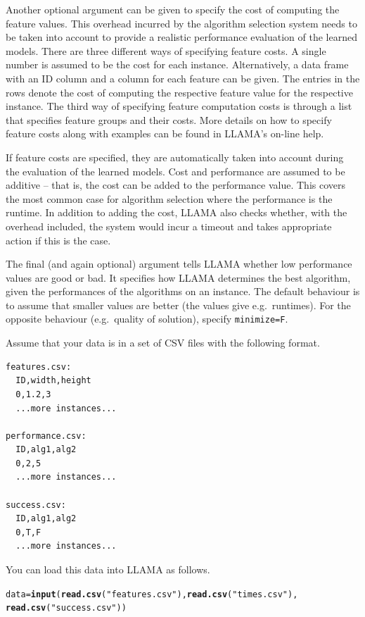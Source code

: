 \documentclass{article}\usepackage[]{graphicx}\usepackage[]{color}
\makeatletter
\newcommand{\hlstr}[1]{\textcolor[rgb]{0.192,0.494,0.8}{#1}}%
\newcommand{\hlstd}[1]{\textcolor[rgb]{0.345,0.345,0.345}{#1}}%
\newcommand{\hlkwb}[1]{\textcolor[rgb]{0.69,0.353,0.396}{#1}}%
\newcommand{\hlkwd}[1]{\textcolor[rgb]{0.737,0.353,0.396}{\textbf{#1}}}%
\newenvironment{kframe}{%
 \def\at@end@of@kframe{}%
 \ifinner\ifhmode%
  \def\at@end@of@kframe{\end{minipage}}%
  \begin{minipage}{\columnwidth}%
 \fi\fi%
 \def\FrameCommand##1{\hskip\@totalleftmargin \hskip-\fboxsep
 \colorbox{shadecolor}{##1}\hskip-\fboxsep
     \hskip-\linewidth \hskip-\@totalleftmargin \hskip\columnwidth}%
 \MakeFramed {\advance\hsize-\width
   \@totalleftmargin\z@ \linewidth\hsize
   \@setminipage}}%
 {\par\unskip\endMakeFramed%
 \at@end@of@kframe}
\newenvironment{knitrout}{}{} %
\makeatother
\begin{document}
Another optional argument can be given to specify the cost of computing the
feature values. This overhead incurred by the algorithm selection system needs
to be taken into account to provide a realistic performance evaluation of the
learned models. There are three different ways of specifying feature costs. A
single number is assumed to be the cost for each instance. Alternatively, a data
frame with an ID column and a column for each feature can be given. The entries
in the rows denote the cost of computing the respective feature value for the
respective instance. The third way of specifying feature computation costs is
through a list that specifies feature groups and their costs. More details on
how to specify feature costs along with examples can be found in LLAMA's on-line
help.

If feature costs are specified, they are automatically taken into account during
the evaluation of the learned models. Cost and performance are assumed to be
additive -- that is, the cost can be added to the performance value. This covers
the most common case for algorithm selection where the performance is the
runtime. In addition to adding the cost, LLAMA also checks whether, with the
overhead included, the system would incur a timeout and takes appropriate action
if this is the case.

The final (and again optional) argument tells LLAMA whether low performance
values are good or bad. It specifies how LLAMA determines the best algorithm,
given the performances of the algorithms on an instance. The default behaviour
is to assume that smaller values are better (the values give e.g.\ runtimes).
For the opposite behaviour (e.g.\ quality of solution), specify
\lstinline{minimize=F}.

\medskip

Assume that your data is in a set of CSV files with the following format.
\begin{verbatim}
features.csv:
  ID,width,height
  0,1.2,3
  ...more instances...

performance.csv:
  ID,alg1,alg2
  0,2,5
  ...more instances...

success.csv:
  ID,alg1,alg2
  0,T,F
  ...more instances...
\end{verbatim}
You can load this data into LLAMA as follows.

\begin{knitrout}
\color{fgcolor}\begin{kframe}
\begin{alltt}
\hlstd{data} \hlkwb{=} \hlkwd{input}\hlstd{(}\hlkwd{read.csv}\hlstd{(}\hlstr{"features.csv"}\hlstd{),} \hlkwd{read.csv}\hlstd{(}\hlstr{"times.csv"}\hlstd{),}
    \hlkwd{read.csv}\hlstd{(}\hlstr{"success.csv"}\hlstd{))}
\end{alltt}
\end{kframe}
\end{knitrout}
\end{document}
